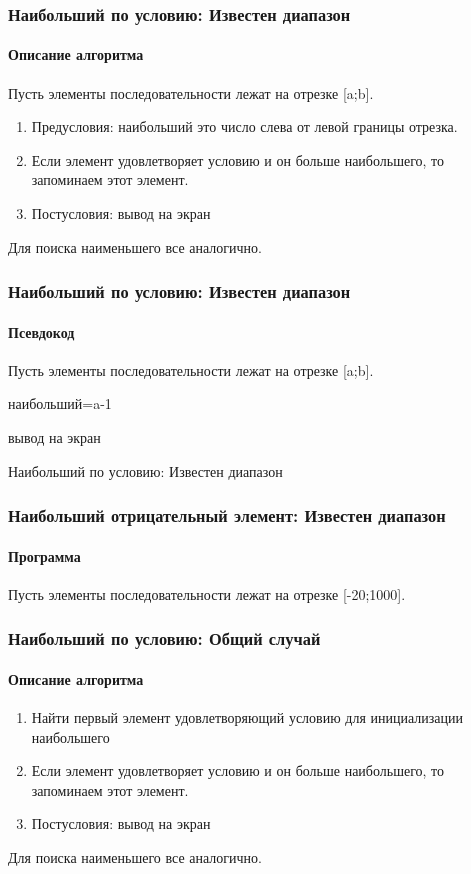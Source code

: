 \begin{frame}[fragile]
\frametitle{Наибольший по условию: Известен диапазон}
\framesubtitle{Описание алгоритма}
Пусть элементы последовательности лежат на отрезке [a;b]. 
\begin{enumerate}
	\item Предусловия: наибольший это число слева от левой границы отрезка.
	\item Если элемент удовлетворяет условию и он больше наибольшего, то запоминаем этот элемент.
	\item Постусловия: вывод на экран
	
\end{enumerate}

Для поиска наименьшего все аналогично.

\end{frame}

\begin{frame}[fragile]
\frametitle{Наибольший по условию: Известен диапазон}
\framesubtitle{Псевдокод}
\small
Пусть элементы последовательности лежат на отрезке [a;b]. 
\begin{algorithm}[H]
		\SetAlgoLined
		наибольший=a-1\;
	
	вывод на экран\;
	\caption{Наибольший по условию: Известен диапазон}
\end{algorithm}


\end{frame}


\begin{frame}[fragile]
\frametitle{Наибольший отрицательный элемент: Известен диапазон}
\framesubtitle{Программа}
Пусть элементы последовательности лежат на отрезке [-20;1000]. 


\end{frame}

\begin{frame}[fragile]
\frametitle{Наибольший по условию: Общий случай}
\framesubtitle{Описание алгоритма}

\begin{enumerate}
	\item Найти первый элемент удовлетворяющий условию для инициализации наибольшего
	\item Если элемент удовлетворяет условию и он больше наибольшего, то запоминаем этот элемент.
	\item Постусловия: вывод на экран
	
\end{enumerate}

Для поиска наименьшего все аналогично.

\end{frame}


